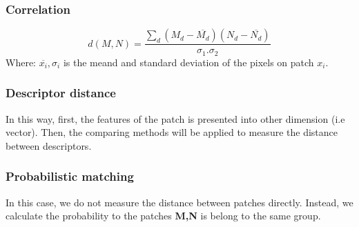 \subsubsection{Correlation}
\begin{equation}\label{correlation}
	d(M,N) = \frac{\sum_d(M_d - \overline{M_d})(N_d - \overline{N_d})}{\sigma_1.\sigma_2}
\end{equation}
Where: $\overline{x_i}, \sigma_i$ is the meand and standard deviation of the pixels on patch $x_i$.
\subsubsection{Descriptor distance}
In this way, first, the features of the patch is presented into other dimension (i.e vector). Then, the comparing methods will be applied to measure the distance between descriptors.
\subsubsection{Probabilistic matching}
In this case, we do not measure the distance between patches directly. Instead, we calculate the probability to the patches \textbf{M,N} is belong to the same group.
